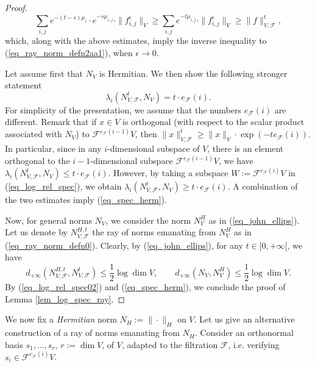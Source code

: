 \documentclass[12pt]{article}
\numberwithin{equation}{section}
\theoremstyle{theorem}
\theoremstyle{definition}
\theoremstyle{remark}
\begin{document}
\begin{proof}
\begin{equation}
			\sum_{i, j}
				e^{- (t - s) \mu_i} 
				\cdot
				e^{- s \mu_{i, j}} \cdot 
				\| f_{i, j}^{\epsilon} \|_V
			\geq
			\sum_{i, j}
				e^{- t  \mu_{i, j}} 
				\cdot 
				\| f_{i, j}^{\epsilon} \|_V
			\geq 
			\| f \|_{V, \mathcal{F}}^t,
		\end{equation}
		which, along with the above estimates, imply the inverse inequality to (\ref{eq_ray_norm_defn2aa1}), when $\epsilon \to 0$.
		\par 
		Let assume first that $N_V$ is Hermitian. We then show the following stronger statement
		\begin{equation}\label{eq_spec_herm}
			\lambda_i(N_{V, \mathcal{F}}^t, N_V) = t \cdot e_{\mathcal{F}}(i).
		\end{equation}
		For simplicity of the presentation, we assume that the numbers $e_{\mathcal{F}}(i)$ are different.
		Remark that if $x \in V$ is orthogonal (with respect to the scalar product associated with $N_V$) to $\mathcal{F}^{e_{\mathcal{F}}(i - 1)} V$, then $\| x \|_{V, \mathcal{F}}^t \geq \| x \|_V \cdot \exp(- t e_{\mathcal{F}}(i))$.
		In particular, since in any $i$-dimensional subspace of $V$, there is an element orthogonal to the $i - 1$-dimensional subspace $\mathcal{F}^{e_{\mathcal{F}}(i - 1)} V$, we have $\lambda_i(N_{V, \mathcal{F}}^t, N_V) \leq t  \cdot e_{\mathcal{F}}(i)$.
		However, by taking a subspace $W := \mathcal{F}^{e_{\mathcal{F}}(i)} V$ in (\ref{eq_log_rel_spec}), we obtain $\lambda_i(N_{V, \mathcal{F}}^t, N_V) \geq t \cdot e_{\mathcal{F}}(i)$.
		A combination of the two estimates imply (\ref{eq_spec_herm}).
		\par 
		Now, for general norms $N_V$, we consider the norm $N_V^H$ as in (\ref{eq_john_ellips}).
		Let us denote by $N_{V, \mathcal{F}}^{H, t}$ the ray of norms emanating from $N_V^H$ as in (\ref{eq_ray_norm_defn0}).
		Clearly, by (\ref{eq_john_ellips}), for any $t \in [0, +\infty[$, we have 
		\begin{equation}
			d_{+ \infty}(N_{V, \mathcal{F}}^{H, t}, N_{V, \mathcal{F}}^t) \leq \frac{1}{2} \log \dim V,
			\qquad
			d_{+ \infty}(N_V, N_V^H) \leq \frac{1}{2} \log \dim V.
		\end{equation}
		By (\ref{eq_log_rel_spec02}) and (\ref{eq_spec_herm}), we conclude the proof of Lemma \ref{lem_log_spec_ray}.
	\end{proof}
	We now fix a \textit{Hermitian} norm $N_H := \| \cdot \|_H$ on $V$. 
	Let us give an alternative construction of a ray of norms emanating from $N_H$.
	Consider an orthonormal basis $s_1, \ldots, s_r$, $r := \dim V$, of $V$, adapted to the filtration $\mathcal{F}$, i.e. verifying $s_i \in \mathcal{F}^{e_{\mathcal{F}}(i)} V$.
\end{document}
